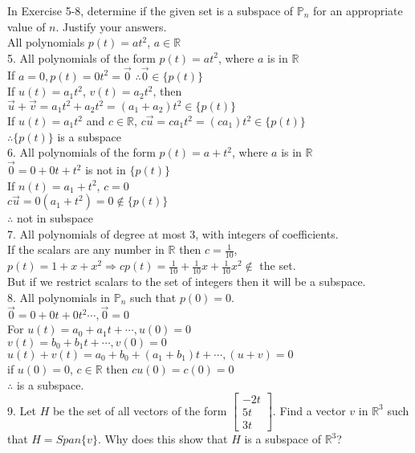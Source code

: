 \documentclass[a4paper]{article}
\begin{document}
In Exercise 5-8, determine if the given set is a subspace of $\mathbb{P}_n$ for an appropriate value of $n$. Justify your answers.\\
All polynomials $p(t) = at^2$, $a \in \mathbb{R}$\\
5. All polynomials of the form $p(t) = at^2$, where $a$ is in $\mathbb{R}$\\
If $a = 0, p(t) = 0t^2 = \vec{0}$ $\therefore \vec{0} \in \{p(t)\}$\\
If $u(t) = a_1t^2$, $v(t) = a_2t^2$, then $\vec{u} + \vec{v} = a_1t^2+a_2t^2 = (a_1+a_2)t^2 \in \{ p(t) \}$\\
If $u(t) = a_1t^2$ and $c \in \mathbb{R}$, $c\vec{u} = ca_1t^2 = (ca_1)t^2 \in \{p(t)\}$\\
$\therefore \{p(t)\}$ is a subspace\\
6. All polynomials of the form $p(t) = a + t^2$, where $a$ is in $\mathbb{R}$\\
$\vec{0} = 0+0t+t^2$ is not in $\{p(t)\}$\\
If $n(t) = a_1 + t^2$, $c = 0$\\
$c\vec{u} = 0(a_1 + t^2) = 0 \notin \{p(t)\}$\\
$\therefore$ not in subspace\\
7. All polynomials of degree at most 3, with integers of coefficients.\\
If the scalars are any number in $\mathbb{R}$ then $c = \frac{1}{10}$, $p(t) = 1+x+x^2 \Rightarrow cp(t) = \frac{1}{10} + \frac{1}{10}x + \frac{1}{10}x^2 \notin$ the set.\\
But if we restrict scalars to the set of integers then it will be a subspace.\\
8. All polynomials in $\mathbb{P}_n$ such that $p(0) = 0$.\\
$\vec{0} = 0+0t+0t^2 \cdots , \vec{0} = 0$\\
For $u(t) = a_0 +a_1t+ \cdots , u(0) = 0$\\
$v(t) = b_0 + b_1t+ \cdots, v(0) = 0$\\
$u(t) + v(t) = a_0+b_0 + (a_1+b_1)t + \cdots , (u + v) = 0$\\
if $u(0) = 0$, $c \in \mathbb{R}$ then $cu(0) = c(0) = 0$\\
$\therefore$ is a subspace.\\
9. Let $H$ be the set of all vectors of the form $\begin{bmatrix}
-2t\\
5t\\
3t
\end{bmatrix}$. Find a vector $v$ in $\mathbb{R}^3$ such that $H = Span\{v\}$. Why does this show that $H$ is a subspace of $\mathbb{R}^3$?\\
\end{document}
